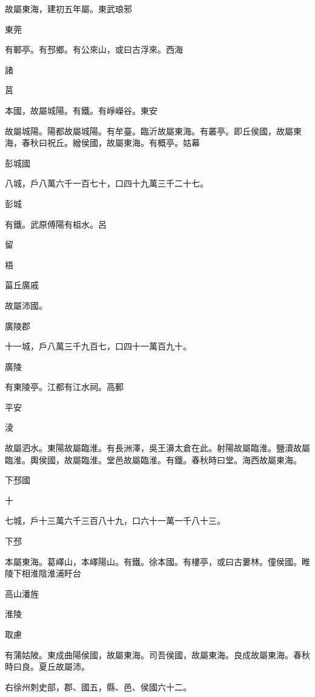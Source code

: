 \begin{pinyinscope}
故屬東海，建初五年屬。東武琅邪

東莞

有鄆亭。有邳鄉。有公來山，或曰古浮來。西海

諸

莒

本國，故屬城陽。有鐵。有崢嶸谷。東安

故屬城陽。陽都故屬城陽。有牟臺。臨沂故屬東海。有叢亭。即丘侯國，故屬東海，春秋曰祝丘。繒侯國，故屬東海。有概亭。姑幕

彭城國

八城，戶八萬六千一百七十，口四十九萬三千二十七。

彭城

有鐵。武原傅陽有柤水。呂

留

梧

菑丘廣戚

故屬沛國。

廣陵郡

十一城，戶八萬三千九百七，口四十一萬百九十。

廣陵

有東陵亭。江都有江水祠。高郵

平安

淩

故屬泗水。東陽故屬臨淮。有長洲澤，吳王濞太倉在此。射陽故屬臨淮。鹽瀆故屬臨淮。輿侯國，故屬臨淮。堂邑故屬臨淮。有鐵。春秋時曰堂。海西故屬東海。

下邳國

十

七城，戶十三萬六千三百八十九，口六十一萬一千八十三。

下邳

本屬東海。葛嶧山，本嶧陽山。有鐵。徐本國。有樓亭，或曰古蔞林。僮侯國。睢陵下相淮陰淮浦盱台

高山潘旌

淮陵

取慮

有蒲姑陂。東成曲陽侯國，故屬東海。司吾侯國，故屬東海。良成故屬東海。春秋時曰良。夏丘故屬沛。

右徐州刺史部，郡、國五，縣、邑、侯國六十二。


\end{pinyinscope}